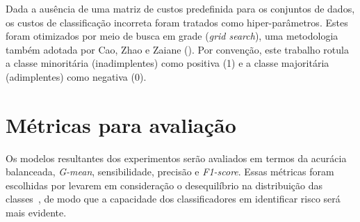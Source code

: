 Dada a ausência de uma matriz de custos predefinida para os conjuntos de dados, os custos de classificação incorreta foram tratados como hiper-parâmetros. Estes foram otimizados por meio de busca em grade (\textit{grid search}), uma metodologia também adotada por Cao, Zhao e Zaiane (\citeyear{Cao2013}). Por convenção, este trabalho rotula a classe minoritária (inadimplentes) como positiva (1) e a classe majoritária (adimplentes) como negativa (0).

\section{Métricas para avaliação}\label{sec:metricas}

Os modelos resultantes dos experimentos serão avaliados em termos da acurácia balanceada, \textit{G-mean}, sensibilidade, precisão e \textit{F1-score}. Essas métricas foram escolhidas por levarem em consideração o desequilíbrio na distribuição das classes~\cite{Namvar2018,Wei2025}, de modo que a capacidade dos classificadores em identificar risco será mais evidente.